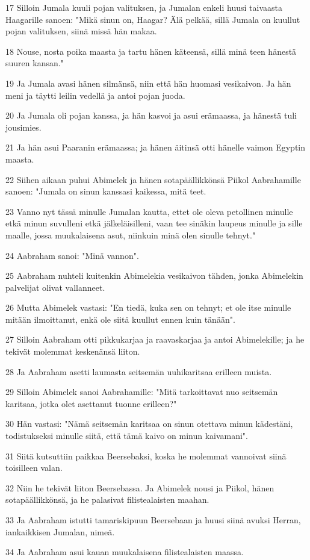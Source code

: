 \par 17 Silloin Jumala kuuli pojan valituksen, ja Jumalan enkeli huusi taivaasta Haagarille sanoen: "Mikä sinun on, Haagar? Älä pelkää, sillä Jumala on kuullut pojan valituksen, siinä missä hän makaa.
\par 18 Nouse, nosta poika maasta ja tartu hänen käteensä, sillä minä teen hänestä suuren kansan."
\par 19 Ja Jumala avasi hänen silmänsä, niin että hän huomasi vesikaivon. Ja hän meni ja täytti leilin vedellä ja antoi pojan juoda.
\par 20 Ja Jumala oli pojan kanssa, ja hän kasvoi ja asui erämaassa, ja hänestä tuli jousimies.
\par 21 Ja hän asui Paaranin erämaassa; ja hänen äitinsä otti hänelle vaimon Egyptin maasta.
\par 22 Siihen aikaan puhui Abimelek ja hänen sotapäällikkönsä Piikol Aabrahamille sanoen: "Jumala on sinun kanssasi kaikessa, mitä teet.
\par 23 Vanno nyt tässä minulle Jumalan kautta, ettet ole oleva petollinen minulle etkä minun suvulleni etkä jälkeläisilleni, vaan tee sinäkin laupeus minulle ja sille maalle, jossa muukalaisena asut, niinkuin minä olen sinulle tehnyt."
\par 24 Aabraham sanoi: "Minä vannon".
\par 25 Aabraham nuhteli kuitenkin Abimelekia vesikaivon tähden, jonka Abimelekin palvelijat olivat vallanneet.
\par 26 Mutta Abimelek vastasi: "En tiedä, kuka sen on tehnyt; et ole itse minulle mitään ilmoittanut, enkä ole siitä kuullut ennen kuin tänään".
\par 27 Silloin Aabraham otti pikkukarjaa ja raavaskarjaa ja antoi Abimelekille; ja he tekivät molemmat keskenänsä liiton.
\par 28 Ja Aabraham asetti laumasta seitsemän uuhikaritsaa erilleen muista.
\par 29 Silloin Abimelek sanoi Aabrahamille: "Mitä tarkoittavat nuo seitsemän karitsaa, jotka olet asettanut tuonne erilleen?"
\par 30 Hän vastasi: "Nämä seitsemän karitsaa on sinun otettava minun kädestäni, todistukseksi minulle siitä, että tämä kaivo on minun kaivamani".
\par 31 Siitä kutsuttiin paikkaa Beersebaksi, koska he molemmat vannoivat siinä toisilleen valan.
\par 32 Niin he tekivät liiton Beersebassa. Ja Abimelek nousi ja Piikol, hänen sotapäällikkönsä, ja he palasivat filistealaisten maahan.
\par 33 Ja Aabraham istutti tamariskipuun Beersebaan ja huusi siinä avuksi Herran, iankaikkisen Jumalan, nimeä.
\par 34 Ja Aabraham asui kauan muukalaisena filistealaisten maassa.

